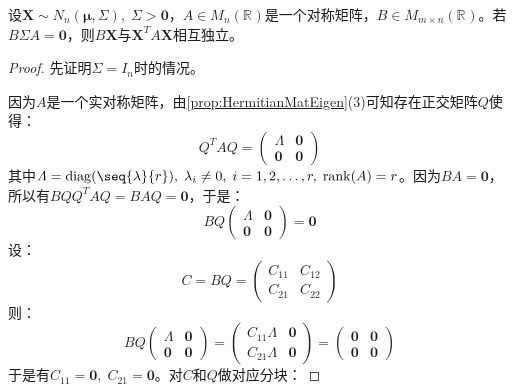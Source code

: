 \begin{theorem}\label{theo:BXXAXIndependent}
	设$\mathbf{X}\sim N_n(\boldsymbol{\mu},\Sigma),\;\Sigma>\mathbf{0}$，$A\in M_{n}(\mathbb{R}^{})$是一个对称矩阵，$B\in M_{m\times n}(\mathbb{R}^{})$。若$B\Sigma A=\mathbf{0}$，则$B\mathbf{X}$与$\mathbf{X}^TA\mathbf{X}$相互独立。
\end{theorem}
\begin{proof}
	先证明$\Sigma=I_n$时的情况。\par
	因为$A$是一个实对称矩阵，由\cref{prop:HermitianMatEigen}(3)可知存在正交矩阵$Q$使得：
	\begin{equation*}
		Q^TAQ=
		\begin{pmatrix}
			\varLambda & \mathbf{0} \\
			\mathbf{0} & \mathbf{0}
		\end{pmatrix}
	\end{equation*}
	其中$\varLambda=\operatorname{diag}(\seq{\lambda}{r}),\;\lambda_i\ne0,\;i=1,2,\dots,r,\;\operatorname{rank}(A)=r$。因为$BA=\mathbf{0}$，所以有$BQQ^TAQ=BAQ=\mathbf{0}$，于是：
	\begin{equation*}
		BQ
		\begin{pmatrix}
			\varLambda & \mathbf{0} \\
			\mathbf{0} & \mathbf{0}
		\end{pmatrix}
		=\mathbf{0}
	\end{equation*}
	设：
	\begin{equation*}
		C=BQ=
		\begin{pmatrix}
			C_{11} & C_{12} \\
			C_{21} & C_{22}
		\end{pmatrix}
	\end{equation*}
	则：
	\begin{equation*}
		BQ
		\begin{pmatrix}
			\varLambda & \mathbf{0} \\
			\mathbf{0} & \mathbf{0}
		\end{pmatrix}
		=
		\begin{pmatrix}
			C_{11}\varLambda & \mathbf{0} \\
			C_{21}\varLambda & \mathbf{0}
		\end{pmatrix}
		=\begin{pmatrix}
			\mathbf{0} & \mathbf{0} \\
			\mathbf{0} & \mathbf{0}
		\end{pmatrix}
	\end{equation*}
	于是有$C_{11}=\mathbf{0},\;C_{21}=\mathbf{0}$。对$C$和$Q$做对应分块：

\end{proof}
